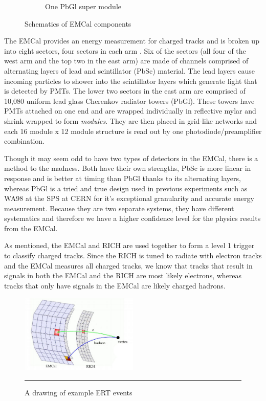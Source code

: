 \begin{figure}
\begin{subfigure}[b]{0.6\textwidth}
    \caption{One PbGl super module}
    \label{fig:Rcpcentvsperiph}
\end{subfigure}
\caption[Schematics of EMCal components]{Schematics of EMCal components}
\label{fig:baryonenhancementAA}
\end{figure}
\dsp

The EMCal provides an energy measurement for charged tracks and is broken up into eight sectors, four sectors in each arm \citep{EMCfocus}. Six of the sectors (all four of the west arm and the top two in the east arm) are made of channels comprised of alternating layers of lead and scintillator (PbSc) material. The lead layers cause incoming particles to shower into the scintillator layers which generate light that is detected by PMTs. The lower two sectors in the east arm are comprised of 10,080 uniform lead glass Cherenkov radiator towers (PbGl). These towers have PMTs attached on one end and are wrapped individually in reflective mylar and shrink wrapped to form \textit{modules}. They are then placed in grid-like networks and each 16 module x 12 module structure is read out by one photodiode/preamplifier combination. 

Though it may seem odd to have two types of detectors in the EMCal, there is a method to the madness. Both have their own strengths, PbSc is more linear in response and is better at timing than PbGl thanks to its alternating layers, whereas PbGl is a tried and true design used in previous experiments such as WA98 at the SPS at CERN for it's exceptional granularity and accurate energy measurement. Because they are two separate systems, they have different systematics and therefore we have a higher confidence level for the physics results from the EMCal. 

As mentioned, the EMCal and RICH are used together to form a level 1 trigger to classify charged tracks. Since the RICH is tuned to radiate with electron tracks and the EMCal measures all charged tracks, we know that tracks that result in signals in both the EMCal and the RICH are most likely electrons, whereas tracks that only have signals in the EMCal are likely charged hadrons.

\begin{figure}[h!]
  \centering
    \includegraphics[width=0.5\textwidth]{Figures/ERT.jpg}
    \rule{35em}{0.5pt}
  \caption[A drawing of example ERT events]{A drawing of example ERT events}
  \label{fig:ERT}
\end{figure}

